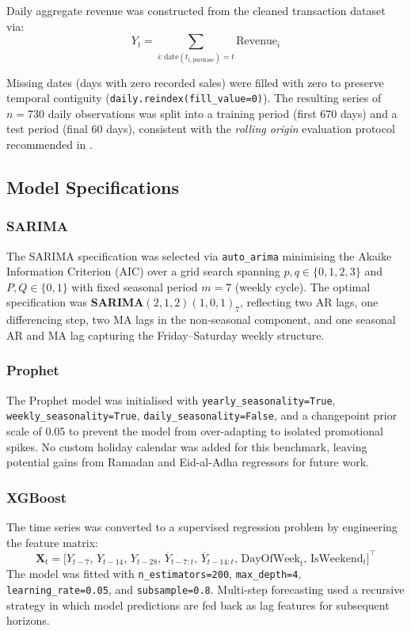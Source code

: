 Daily aggregate revenue was constructed from the cleaned transaction dataset via:
\begin{equation}
    Y_t = \sum_{i : \text{date}(t_{i,\text{purchase}}) = t} \text{Revenue}_i
    \label{eq:daily_revenue}
\end{equation}

Missing dates (days with zero recorded sales) were filled with zero to preserve temporal contiguity (\texttt{daily.reindex(fill\_value=0)}). The resulting series of $n = 730$ daily observations was split into a training period (first 670 days) and a test period (final 60 days), consistent with the \textit{rolling origin} evaluation protocol recommended in \cite{MethodsSalesForecasting2022}.

\subsection{Model Specifications}

\subsubsection{SARIMA}
The SARIMA specification was selected via \texttt{auto\_arima} minimising the Akaike Information Criterion (AIC) over a grid search spanning $p, q \in \{0, 1, 2, 3\}$ and $P, Q \in \{0, 1\}$ with fixed seasonal period $m = 7$ (weekly cycle). The optimal specification was \textbf{SARIMA$(2,1,2)(1,0,1)_7$}, reflecting two AR lags, one differencing step, two MA lags in the non-seasonal component, and one seasonal AR and MA lag capturing the Friday--Saturday weekly structure.

\subsubsection{Prophet}
The Prophet model was initialised with \texttt{yearly\_seasonality=True}, \texttt{weekly\_seasonality=True}, \texttt{daily\_seasonality=False}, and a changepoint prior scale of 0.05 to prevent the model from over-adapting to isolated promotional spikes. No custom holiday calendar was added for this benchmark, leaving potential gains from Ramadan and Eid-al-Adha regressors for future work.

\subsubsection{XGBoost}
The time series was converted to a supervised regression problem by engineering the feature matrix:
\begin{equation}
    \mathbf{X}_t = \bigl[Y_{t-7},\, Y_{t-14},\, Y_{t-28},\, \overline{Y}_{t-7:t},\, \overline{Y}_{t-14:t},\, \text{DayOfWeek}_t,\, \text{IsWeekend}_t \bigr]^\top
    \label{eq:xgb_features}
\end{equation}
The model was fitted with \texttt{n\_estimators=200}, \texttt{max\_depth=4}, \texttt{learning\_rate=0.05}, and \texttt{subsample=0.8}. Multi-step forecasting used a recursive strategy in which model predictions are fed back as lag features for subsequent horizons.

